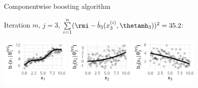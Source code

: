 \documentclass[11pt,compress,t,notes=noshow, xcolor=table]{beamer}
\begin{document}
\begin{vbframe}{Componentwise boosting algorithm}



{\footnotesize Iteration $m$, $j = 3$, $\sum  \limits_{i=1}^n (\rmi - \hat{b}_3(x^{(i)}_3, \thetamh_3))^2 = 35.2$: }
\begin{center}
{\includegraphics[width=0.25\textwidth]{figure/boosting-cwb-bl1-points.png}}
\hspace*{0.5cm}
{\includegraphics[width=0.25\textwidth]{figure/boosting-cwb-bl2-points.png}} 
\hspace*{0.5cm}
\includegraphics[width=0.25\textwidth]{figure/boosting-cwb-bl3-points.png}
\end{center}
\addtocounter{framenumber}{-1}
\end{vbframe}

\end{document}
